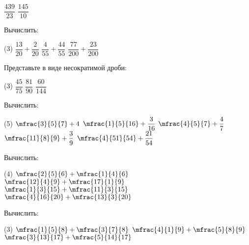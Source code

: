 \begin{class}[number=1]
\begin{listofex}
\begin{tasks}
			\task \( \dfrac{439}{23} \)
			\task \( \dfrac{145}{10} \)
		\end{tasks}
		\item Вычислить:
		\begin{tasks}(3)
			\task \( \dfrac{13}{20}+\dfrac{2}{20} \)
			\task \( \dfrac{4}{55}+\dfrac{44}{55} \)
			\task \( \dfrac{77}{200}+\dfrac{23}{200} \)
		\end{tasks}
		\item Представьте в виде несократимой дроби:
		\begin{tasks}(3)
			\task \( \dfrac{45}{75} \)
			\task \( \dfrac{81}{90} \)
			\task \( \dfrac{60}{144} \)
		\end{tasks}
		\item Вычислить:
		\begin{tasks}(5)
			\task \( \mfrac{3}{5}{7}+4 \)
			\task \( \mfrac{1}{5}{16}+\dfrac{3}{16} \)
			\task \( \mfrac{4}{5}{7}+\dfrac{4}{7} \)
			\task \( \mfrac{11}{8}{9}+\dfrac{3}{9} \)
			\task \( \mfrac{4}{51}{54}+\dfrac{21}{54} \)
		\end{tasks}
		\item Вычислить:
		\begin{tasks}(4)
			\task \( \mfrac{2}{5}{6}+\mfrac{1}{4}{6} \)
			\task \( \mfrac{12}{4}{9}+\mfrac{17}{1}{9} \)
			\task \( \mfrac{1}{3}{15}+\mfrac{11}{3}{15} \)
			\task \( \mfrac{4}{16}{20}+\mfrac{13}{3}{20} \)
		\end{tasks}
		\item Вычислить:
		\begin{tasks}(3)
			\task \( \mfrac{1}{5}{8}+\mfrac{3}{7}{8} \)
			\task \( \mfrac{4}{1}{9}+\mfrac{5}{8}{9} \)
			\task \( \mfrac{3}{13}{17}+\mfrac{5}{14}{17} \)
		\end{tasks}
	\end{listofex}
\end{class}
%
%
%
%
%	
%
%
